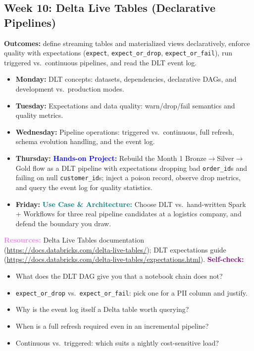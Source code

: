 \documentclass[11pt, a4paper]{article}
\newcommand{\project}[1]{\vspace{1mm}\noindent\textbf{\textcolor{blue}{Hands-on Project:}} #1}
\newcommand{\usecase}[1]{\vspace{1mm}\noindent\textbf{\textcolor{teal}{Use Case \& Architecture:}} #1}
\newcommand{\dayitem}[2]{\item \textbf{#1:} #2}
\newcommand{\resources}[1]{\vspace{1mm}\noindent\textbf{\textcolor{violet}{Resources:}} #1}
\newcommand{\selfcheck}[1]{\vspace{1mm}\noindent\textbf{\textcolor{purple}{Self-check:}} #1}
\begin{document}
\subsection*{Week 10: Delta Live Tables (Declarative Pipelines)}
\par\noindent\textbf{Outcomes:} define streaming tables and materialized views declaratively, enforce quality with expectations (\texttt{expect}, \texttt{expect\_or\_drop}, \texttt{expect\_or\_fail}), run triggered vs.\ continuous pipelines, and read the DLT event log.
\begin{itemize}[label=-]
    \dayitem{Monday}{DLT concepts: datasets, dependencies, declarative DAGs, and development vs.\ production modes.}
    \dayitem{Tuesday}{Expectations and data quality: warn/drop/fail semantics and quality metrics.}
    \dayitem{Wednesday}{Pipeline operations: triggered vs.\ continuous, full refresh, schema evolution handling, and the event log.}
    \dayitem{Thursday}{\project{Rebuild the Month 1 Bronze$\rightarrow$Silver$\rightarrow$Gold flow as a DLT pipeline with expectations dropping bad \texttt{order\_id}s and failing on null \texttt{customer\_id}s; inject a poison record, observe drop metrics, and query the event log for quality statistics.}}
    \dayitem{Friday}{\usecase{Choose DLT vs.\ hand-written Spark + Workflows for three real pipeline candidates at a logistics company, and defend the boundary you draw.}}
\end{itemize}
\resources{Delta Live Tables documentation (\url{https://docs.databricks.com/delta-live-tables/}); DLT expectations guide (\url{https://docs.databricks.com/delta-live-tables/expectations.html}).}
\selfcheck{\begin{itemize}[label=-, leftmargin=1.5em, itemsep=0pt]
    \item What does the DLT DAG give you that a notebook chain does not?
    \item \texttt{expect\_or\_drop} vs.\ \texttt{expect\_or\_fail}: pick one for a PII column and justify.
    \item Why is the event log itself a Delta table worth querying?
    \item When is a full refresh required even in an incremental pipeline?
    \item Continuous vs.\ triggered: which suits a nightly cost-sensitive load?
\end{itemize}}
\end{document}
